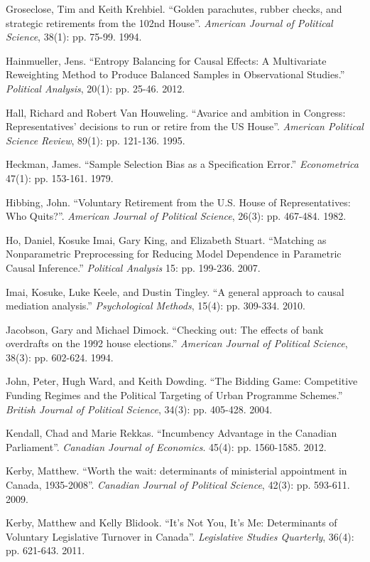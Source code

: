 \documentclass[letter,12pt]{article}
\begin{document}
\begin{hangparas}{.25in}{1}
Groseclose, Tim and Keith Krehbiel. ``Golden parachutes, rubber checks, and strategic retirements from the 102nd House''. \textit{American Journal of Political Science}, 38(1): pp. 75-99. 1994.

Hainmueller, Jens. ``Entropy Balancing for Causal Effects: A Multivariate Reweighting Method to Produce Balanced Samples in Observational Studies.'' \textit{Political Analysis}, 20(1): pp. 25-46. 2012.

Hall, Richard and Robert Van Houweling. ``Avarice and ambition in Congress: Representatives' decisions to run or retire from the US House''. \textit{American Political Science Review}, 89(1): pp. 121-136. 1995.

Heckman, James. ``Sample Selection Bias as a Specification Error.'' \textit{Econometrica} 47(1): pp. 153-161. 1979.

Hibbing, John. ``Voluntary Retirement from the U.S. House of Representatives: Who Quits?''. \textit{American Journal of Political Science}, 26(3): pp. 467-484. 1982.

Ho, Daniel, Kosuke Imai, Gary King, and Elizabeth Stuart. ``Matching as Nonparametric Preprocessing for Reducing Model Dependence in Parametric Causal Inference.'' \textit{Political Analysis} 15: pp. 199-236. 2007.

Imai, Kosuke, Luke Keele, and Dustin Tingley. ``A general approach to causal mediation analysis.'' \textit{Psychological Methods}, 15(4): pp. 309-334. 2010.

Jacobson, Gary and Michael Dimock. ``Checking out: The effects of bank overdrafts on the 1992 house elections.'' \textit{American Journal of Political Science}, 38(3): pp. 602-624. 1994.

John, Peter, Hugh Ward, and Keith Dowding. ``The Bidding Game: Competitive Funding Regimes and the Political Targeting of Urban Programme Schemes.'' \textit{British Journal of Political Science}, 34(3): pp. 405-428. 2004.

Kendall, Chad and Marie Rekkas. ``Incumbency Advantage in the Canadian Parliament''. \textit{Canadian Journal of Economics}. 45(4): pp. 1560-1585. 2012.

Kerby, Matthew. ``Worth the wait: determinants of ministerial appointment in Canada, 1935-2008''.
\textit{Canadian Journal of Political Science}, 42(3): pp. 593-611. 2009.

Kerby, Matthew and Kelly Blidook. ``It's Not You, It's Me: Determinants of Voluntary Legislative Turnover in Canada''. \textit{Legislative Studies Quarterly}, 36(4): pp. 621-643. 2011.


\end{hangparas}
\end{document}
